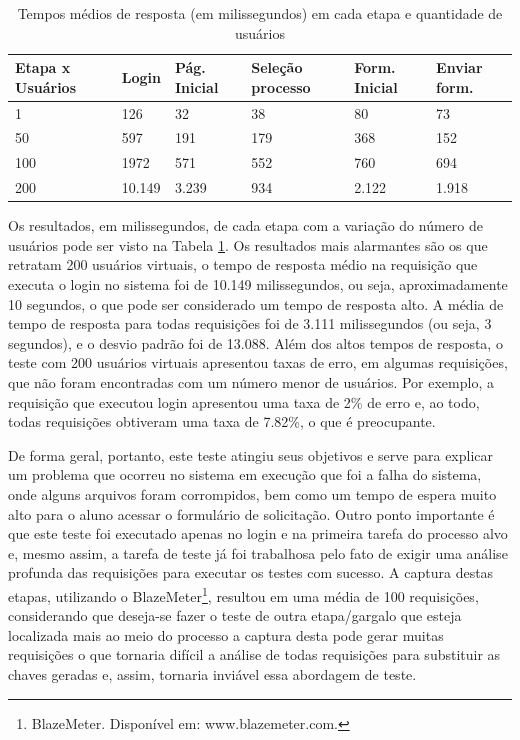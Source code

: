 \documentclass[12pt]{article}
\begin{document}
\begin{table}
{\scriptsize
\centering
\begin{tabular}{|p{2cm}|p{2cm}|p{2cm}|p{2cm}|p{2cm}|p{2cm}|}
 Etapa x Usuários & Login & Pág. Inicial & Seleção processo & Form. Inicial & Enviar form. \\\hline
1 & 126 & 32 & 38 & 80 & 73\\\hline
50 & 597 & 191 & 179 & 368 & 152\\\hline
100 & 1972 & 571 & 552 & 760 & 694\\\hline
200 & 10.149 & 3.239 & 934 & 2.122 & 1.918\\\hline
\end{tabular}
}
\caption{Tempos médios de resposta (em milissegundos) em cada etapa e quantidade de usuários}
\label{tab:resultadoCarga}
\end{table}


Os resultados, em milissegundos, de cada etapa com a variação do número de usuários pode ser visto na Tabela \ref{tab:resultadoCarga}. Os resultados mais alarmantes são os que retratam 200 usuários virtuais, o tempo de resposta médio na requisição que executa o login no sistema foi de 10.149 milissegundos, ou seja, aproximadamente 10 segundos, o que pode ser considerado um tempo de resposta alto. A média de tempo de resposta para todas requisições foi de 3.111 milissegundos (ou seja, 3 segundos), e o desvio padrão foi de 13.088. Além dos altos tempos de resposta, o teste com 200 usuários virtuais apresentou taxas de erro, em algumas requisições, que não foram encontradas com um número menor de usuários. Por exemplo, a requisição que executou login apresentou uma taxa de 2\% de erro e, ao todo, todas requisições obtiveram uma taxa de 7.82\%, o que é preocupante.

De forma geral, portanto, este teste atingiu seus objetivos e serve para explicar um problema que ocorreu no sistema em execução que foi a falha do sistema, onde alguns arquivos foram corrompidos, bem como um tempo de espera muito alto para o aluno acessar o formulário de solicitação. Outro ponto importante é que este teste foi executado apenas no login e na primeira tarefa do processo alvo e, mesmo assim, a tarefa de teste já foi trabalhosa pelo fato de exigir uma análise profunda das requisições para executar os testes com sucesso. A captura destas etapas, utilizando o BlazeMeter\footnote{BlazeMeter. Disponível em: www.blazemeter.com.}, resultou em uma média de 100 requisições, considerando que deseja-se fazer o teste de outra etapa/gargalo que esteja localizada mais ao meio do processo a captura desta pode gerar muitas requisições o que tornaria difícil a análise de todas requisições para substituir as chaves geradas e, assim, tornaria inviável essa abordagem de teste. 
\end{document}
